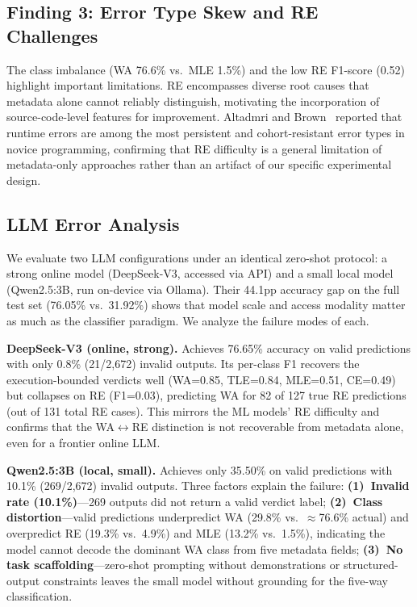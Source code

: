 \documentclass[acmsmall]{acmart}
\begin{document}
\subsection{Finding 3: Error Type Skew and RE Challenges}

The class imbalance (WA 76.6\% vs.\ MLE 1.5\%) and the low RE F1-score (0.52)
highlight important limitations. RE encompasses diverse root causes that
metadata alone cannot reliably distinguish, motivating the incorporation of
source-code-level features for improvement. Altadmri and Brown~\cite{altadmri2015most} reported that runtime errors are
among the most persistent and cohort-resistant error types in novice
programming, confirming that RE difficulty is a general limitation of
metadata-only approaches rather than an artifact of our specific
experimental design.

\subsection{LLM Error Analysis}

We evaluate two LLM configurations under an identical zero-shot protocol: a
strong online model (DeepSeek-V3, accessed via API) and a small local model
(Qwen2.5:3B, run on-device via Ollama). Their 44.1pp accuracy gap on the
full test set (76.05\% vs.\ 31.92\%) shows that model scale and access
modality matter as much as the classifier paradigm. We analyze the failure
modes of each.

\textbf{DeepSeek-V3 (online, strong).} Achieves 76.65\% accuracy on valid
predictions with only 0.8\% (21/2,672) invalid outputs. Its per-class F1
recovers the execution-bounded verdicts well (WA=0.85, TLE=0.84, MLE=0.51,
CE=0.49) but collapses on RE (F1=0.03), predicting WA for 82 of 127 true RE
predictions (out of 131 total RE cases). This mirrors the ML models' RE
difficulty and confirms that the
WA$\leftrightarrow$RE distinction is not recoverable from metadata alone, even
for a frontier online LLM.

\textbf{Qwen2.5:3B (local, small).} Achieves only 35.50\% on valid predictions
with 10.1\% (269/2,672) invalid outputs. Three factors explain the failure:
\textbf{(1)~Invalid rate (10.1\%)}---269 outputs did not return a valid
verdict label; \textbf{(2)~Class distortion}---valid predictions underpredict
WA (29.8\% vs.\ $\approx$76.6\% actual) and overpredict RE (19.3\% vs.\ 4.9\%)
and MLE (13.2\% vs.\ 1.5\%), indicating the model cannot decode the dominant
WA class from five metadata fields; \textbf{(3)~No task scaffolding}---zero-shot
prompting without demonstrations or structured-output constraints leaves the
small model without grounding for the five-way classification.
\end{document}
